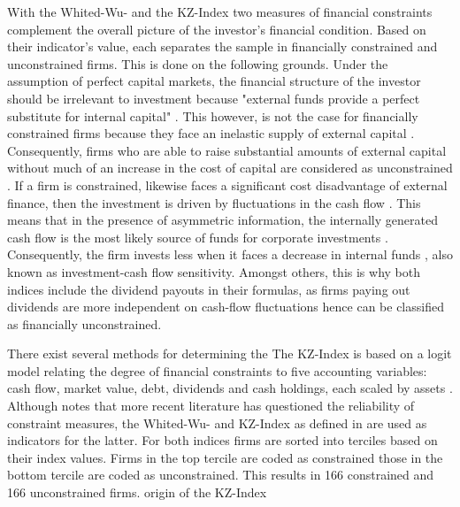 \documentclass[12pt]{article}
\begin{document}
With the Whited-Wu- and the KZ-Index two measures of financial constraints complement the overall picture of the investor's financial condition. Based on their indicator's value, each separates the sample in financially constrained and unconstrained firms. This is done on the following grounds. Under the assumption of perfect capital markets, the financial structure of the investor should be irrelevant to investment because "external funds provide a perfect substitute for internal capital" \citep[p. 141]{Fazzari2016}. This however, is not the case for financially constrained firms because they face an inelastic supply of external capital \citep[p.1]{Farre-mensa2013}. Consequently, firms who are able to raise substantial amounts of external capital without much of an increase in the cost of capital are considered as unconstrained \citep[p.1]{Farre-mensa2013}. If a firm is constrained, likewise faces a significant cost disadvantage of external finance, then the investment is driven by fluctuations in the cash flow \citep[p. 142]{Fazzari1988}. This means that in the presence of asymmetric information, the internally generated cash flow is the most likely source of funds for corporate investments \citep[p.450]{Bhagat2005}. Consequently, the firm invests less when it faces a decrease in internal funds \citep[p.451]{Bhagat2005}, also known as investment-cash flow sensitivity. Amongst others, this is why both indices include the dividend payouts in their formulas, as firms paying out dividends are more independent on cash-flow fluctuations hence can be classified as financially unconstrained.

There exist several methods for determining the 
The KZ-Index is based on a logit model relating the degree of financial constraints to five accounting variables: cash flow, market value, debt, dividends and cash holdings, each scaled by assets \citep[p.5]{Farre-mensa2013}. Although \citet{Khatami2014} notes that more recent literature has questioned the reliability of constraint measures, the Whited-Wu- and KZ-Index as defined in \citet{Farre-mensa2013} are used as indicators for the latter. For both indices firms are sorted into terciles based on their index values. Firms in the top tercile are coded as constrained those in the bottom tercile are coded as unconstrained. This results in 166 constrained and 166 unconstrained firms.
origin of the KZ-Index
\end{document}
